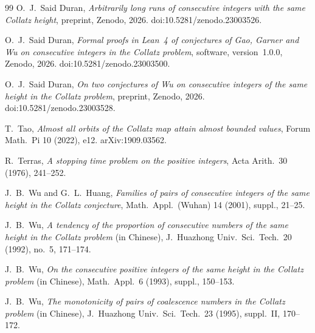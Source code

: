 \documentclass[11pt]{amsart}
\theoremstyle{definition}
\theoremstyle{remark}
\begin{document}
\begin{thebibliography}{99}
 O.~J.~Said Duran, \emph{Arbitrarily long runs of consecutive integers with the same Collatz height}, preprint, Zenodo, 2026. doi:10.5281/zenodo.23003526.

 O.~J.~Said Duran, \emph{Formal proofs in Lean~4 of conjectures of Gao, Garner and Wu on consecutive integers in the Collatz problem}, software, version~1.0.0, Zenodo, 2026. doi:10.5281/zenodo.23003500.

 O.~J.~Said Duran, \emph{On two conjectures of Wu on consecutive integers of the same height in the Collatz problem}, preprint, Zenodo, 2026. doi:10.5281/zenodo.23003528.

 T.~Tao, \emph{Almost all orbits of the Collatz map attain almost bounded values}, Forum Math.\ Pi 10 (2022), e12. arXiv:1909.03562.

 R.~Terras, \emph{A stopping time problem on the positive integers}, Acta Arith.\ 30 (1976), 241--252.

 J.~B.~Wu and G.~L.~Huang, \emph{Families of pairs of consecutive integers of the same height in the Collatz conjecture}, Math.\ Appl.\ (Wuhan) 14 (2001), suppl., 21--25.

 J.~B.~Wu, \emph{A tendency of the proportion of consecutive numbers of the same height in the Collatz problem} (in Chinese), J.~Huazhong Univ.\ Sci.\ Tech.\ 20 (1992), no.~5, 171--174.

 J.~B.~Wu, \emph{On the consecutive positive integers of the same height in the Collatz problem} (in Chinese), Math.\ Appl.\ 6 (1993), suppl., 150--153.

 J.~B.~Wu, \emph{The monotonicity of pairs of coalescence numbers in the Collatz problem} (in Chinese), J.~Huazhong Univ.\ Sci.\ Tech.\ 23 (1995), suppl.~II, 170--172.

\end{thebibliography}
\end{document}
